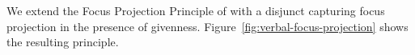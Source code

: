 \documentclass[output=paper]{langsci/langscibook}
\begin{document}
We extend the Focus Projection Principle of
\citet{dKM2003a} with a disjunct capturing focus
projection in the presence of givenness. Figure~\ref{fig:verbal-focus-projection} shows the resulting principle.
%
\end{document}
